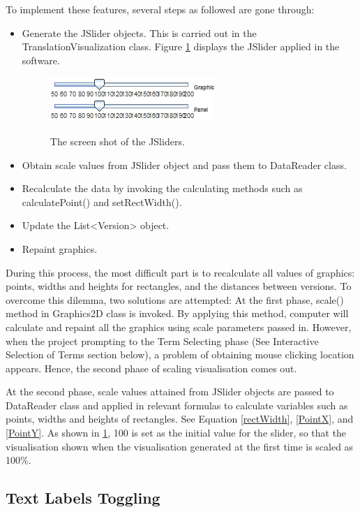 To implement these features, several steps as followed are gone through:
\begin{itemize}
	\item \textbf{} Generate the JSlider objects. This is carried out in the TranslationVisualization class. Figure \ref{fig:jSliders} displays the JSlider applied in the software.
	\begin{figure}[H]
		\centering	
		\includegraphics[scale=1]{Figs/JSliders}\\[1ex]
		\caption{The screen shot of the JSliders.}
		\label{fig:jSliders}
	\end{figure} 	
	\item \textbf{} Obtain scale values from JSlider object and pass them to DataReader class.
	\item \textbf{} Recalculate the data by invoking the calculating methods such as calculatePoint() and setRectWidth().
	\item \textbf{} Update the List<Version> object.
	\item \textbf{} Repaint graphics.
\end{itemize} 
 
During this process, the most difficult part is to recalculate all values of graphics: points, widths and heights for rectangles, and the distances between versions. To overcome this dilemma, two solutions are attempted:
At the first phase, scale() method in Graphics2D class is invoked. By applying this method, computer will calculate and repaint all the graphics using scale parameters passed in. However, when the project prompting to the Term Selecting phase (See Interactive Selection of Terms section below), a problem of obtaining mouse clicking location appears. Hence, the second phase of scaling visualisation comes out.  

At the second phase, scale values attained from JSlider objects are passed to DataReader class and applied in relevant formulas to calculate variables such as points, widths and heights of rectangles. See Equation \eqref{rectWidth}, \eqref{PointX}, and \eqref{PointY}. As shown in \ref{fig:jSliders}, 100 is set as the initial value for the slider, so that the visualisation shown when the visualisation generated at the first time is scaled as 100\%. 
\subsection{Text Labels Toggling}


